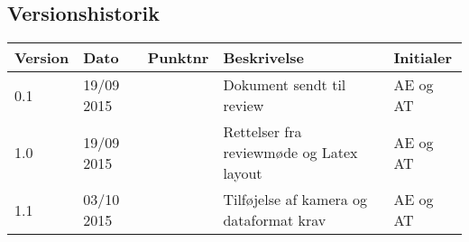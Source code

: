 \subsection{Versionshistorik}

\begin{center}
		\begin{longtable}{ | m{2.5cm} | m{2.5cm}| m{2.5cm}| m{2.5cm}| m{2.5cm}| } 
			\hline
			\textbf{Version} & \textbf{Dato} & \textbf{Punktnr} & \textbf{Beskrivelse} & \textbf{Initialer}  \\ 
			\hline
			0.1 &  19/09 2015 & & Dokument sendt til review & AE og AT \\
			\hline
		1.0  &  19/09 2015 & & Rettelser fra reviewmøde og Latex layout & AE og AT \\
			\hline
			1.1  &  03/10 2015 & & Tilføjelse af kamera og dataformat krav & AE og AT \\
			\hline
		\end{longtable}
		
	\end{center}
	\pagebreak